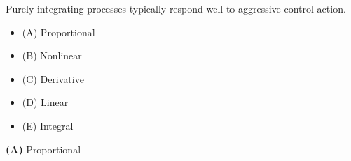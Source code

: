 

Purely integrating processes typically respond well to aggressive \underbar{\hskip 50pt} control action.

\begin{itemize}
\item{(A)} Proportional
\vskip 5pt 
\item{(B)} Nonlinear
\vskip 5pt 
\item{(C)} Derivative
\vskip 5pt 
\item{(D)} Linear
\vskip 5pt 
\item{(E)} Integral
\end{itemize}







{\bf (A)} Proportional











